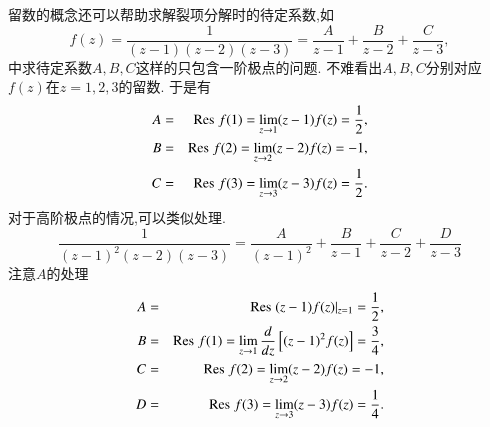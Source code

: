 留数的概念还可以帮助求解裂项分解时的待定系数,如
$$
    f(z) = \frac{1}{(z-1)(z-2)(z-3)} = \frac{A}{z-1} + \frac{B}{z-2} + \frac{C}{z-3},
$$
中求待定系数$A,B,C$这样的只包含一阶极点的问题. 不难看出$A,B,C$分别对应$f(z)$在$z=1,2,3$的留数.
于是有
\begin{eqnarray*}
    A &=& {\mathrm{Res}\;} f(1) = \lim_{z\to 1} (z-1) f(z) = {\frac{1}{2}},
    \\
    B &=& {\mathrm{Res}\;} f(2) = \lim_{z\to 2} (z-2) f(z) = -1,
    \\
    C &=& {\mathrm{Res}\;} f(3) = \lim_{z\to 3} (z-3) f(z) = {\frac{1}{2}}.
\end{eqnarray*}
对于高阶极点的情况,可以类似处理.
$$
\frac{1}{(z-1)^2(z-2)(z-3)}=\frac{A}{(z-1)^2}+\frac{B}{z-1}+\frac{C}{z-2}+\frac{D}{z-3}
$$
注意$A$的处理
\begin{eqnarray*}
    A &=& {\mathrm{Res}\;}  (z-1) f(z) |_{z=1}  = {\frac{1}{2}},
    \\
    B &=& {\mathrm{Res}\;} f(1) =  \lim_{z\to 1} \frac{d}{dz} \left[ (z-1)^2 f(z) \right] = \frac{3}{4},
    \\
    C &=& {\mathrm{Res}\;} f(2) = \lim_{z\to 2} (z-2) f(z) = -1,
    \\
    D &=& {\mathrm{Res}\;} f(3) = \lim_{z\to 3} (z-3) f(z) = \frac{1}{4}.
\end{eqnarray*}
